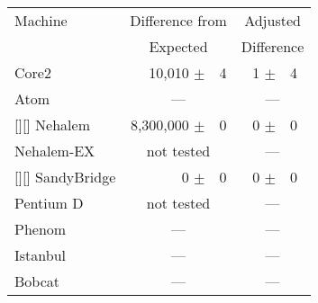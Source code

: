 
\begin{tabular}{|l||rl|rl|}

\hline
Machine   & \multicolumn{2}{c|}{Difference from} & \multicolumn{2}{c|}{Adjusted} \\
          & \multicolumn{2}{c|}{Expected}        & \multicolumn{2}{c|}{Difference} \\
\hline
\hline

Core2           & 10,010 $\pm$ & 4           &          1 $\pm$ & 4 \\
\hline
Atom            & \multicolumn{2}{c|}{---}   &  \multicolumn{2}{c|}{---}\\
\hline
\rowcolor{yellow}[\tabcolsep][\tabcolsep]
Nehalem        & 8,300,000 $\pm$ & 0          & 0 $\pm$ & 0 \\
\hline
Nehalem-EX     & \multicolumn{2}{c|}{not tested}  & \multicolumn{2}{c|}{---}\\
\hline
\rowcolor{yellow}[\tabcolsep][\tabcolsep]
 SandyBridge    &       0 $\pm$ & 0            &    0 $\pm$ &  0 \\
\hline
Pentium D      & \multicolumn{2}{c|}{not tested} &  \multicolumn{2}{c|}{---}\\
\hline
Phenom         & \multicolumn{2}{c|}{---} &   \multicolumn{2}{c|}{---}\\
\hline
Istanbul       & \multicolumn{2}{c|}{---} &   \multicolumn{2}{c|}{---}\\
\hline
Bobcat       & \multicolumn{2}{c|}{---} &   \multicolumn{2}{c|}{---}\\
\hline
\end{tabular}


